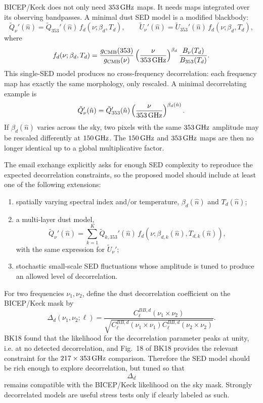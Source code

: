 \documentclass[11pt]{article}
\begin{document}
BICEP/Keck does not only need $353\,{\rm GHz}$ maps.  It needs maps integrated
over its observing bandpasses.  A minimal dust SED model is a modified
blackbody:
\[
  \tilde Q_\nu'(\hat n)
  =
  \tilde Q_{353}'(\hat n)\,
  f_d(\nu;\beta_d,T_d),
  \qquad
  \tilde U_\nu'(\hat n)
  =
  \tilde U_{353}'(\hat n)\,
  f_d(\nu;\beta_d,T_d),
\]
where
\[
  f_d(\nu;\beta_d,T_d)
  =
  \frac{g_{\rm CMB}(353)}{g_{\rm CMB}(\nu)}
  \left(\frac{\nu}{353\,{\rm GHz}}\right)^{\beta_d}
  \frac{B_\nu(T_d)}{B_{353}(T_d)}.
\]
This single-SED model produces no cross-frequency decorrelation: each
frequency map has exactly the same morphology, only rescaled.  A minimal
decorrelating example is
\[
  \tilde Q_\nu'(\hat n)
  =
  \tilde Q_{353}'(\hat n)
  \left(\frac{\nu}{353\,{\rm GHz}}\right)^{\beta_d(\hat n)}.
\]
If $\beta_d(\hat n)$ varies across the sky, two pixels with the same
$353\,{\rm GHz}$ amplitude may be rescaled differently at $150\,{\rm GHz}$.
The $150\,{\rm GHz}$ and $353\,{\rm GHz}$ maps are then no longer identical
up to a global multiplicative factor.


The email exchange
explicitly asks for enough SED complexity to reproduce the expected
decorrelation constraints, so the proposed model should include at least one
of the following extensions:
\begin{enumerate}[label=(S\arabic*)]
  \item spatially varying spectral index and/or temperature,
  $\beta_d(\hat n)$ and $T_d(\hat n)$;

  \item a multi-layer dust model,
  \[
    \tilde Q_\nu'(\hat n)
    =
    \sum_{k=1}^{K}
    \tilde Q_{k,353}'(\hat n)\,
    f_d(\nu;\beta_{d,k}(\hat n),T_{d,k}(\hat n)),
  \]
  with the same expression for $\tilde U_\nu'$;

  \item stochastic small-scale SED fluctuations whose amplitude is tuned to
  produce an allowed level of decorrelation.
\end{enumerate}

For two frequencies $\nu_1,\nu_2$, define the dust decorrelation coefficient
on the BICEP/Keck mask by
\[
  \Delta_d(\nu_1,\nu_2;\ell)
  =
  \frac{
    C_\ell^{BB,d}(\nu_1\times\nu_2)
  }{
    \sqrt{
      C_\ell^{BB,d}(\nu_1\times\nu_1)
      C_\ell^{BB,d}(\nu_2\times\nu_2)
    }
  }.
\]
BK18 found that the likelihood for the decorrelation parameter peaks at unity,
i.e. at no detected decorrelation, and Fig.~18 of BK18 provides the relevant
constraint for the $217\times353\,{\rm GHz}$ comparison.  Therefore the SED
model should be rich enough to explore decorrelation, but tuned so that
\[
  \Delta_d
\]
remains compatible with the BICEP/Keck likelihood on the sky mask.  Strongly
decorrelated models are useful stress tests only if clearly labeled as such.
\end{document}
